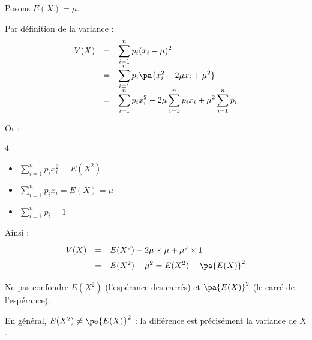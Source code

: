 \begin{demonstration}
	Posons $E(X) = \mu$.

	Par définition de la variance :
	\[
		\def\arraystretch{1.3}
		\begin{array}{rcl}
			V(X) & = & \displaystyle\sum_{i=1}^{n} p_i (x_i - \mu)^2                                                  \\
			     & = & \displaystyle\sum_{i=1}^{n} p_i \pa{x_i^2 - 2\mu x_i + \mu^2}                                  \\
			     & = & \displaystyle\sum_{i=1}^{n} p_i x_i^2 - 2\mu \sum_{i=1}^{n} p_i x_i + \mu^2 \sum_{i=1}^{n} p_i
		\end{array}
	\]

	Or :
	\begin{multicols}{4}
		\begin{itemize}
			\item $\displaystyle\sum_{i=1}^{n} p_i x_i^2 = E(X^2)$
			\item $\displaystyle\sum_{i=1}^{n} p_i x_i = E(X) = \mu$
			\item $\displaystyle\sum_{i=1}^{n} p_i = 1$
		\end{itemize}
	\end{multicols}

	Ainsi :
	\[
		\begin{array}{rcl}
			V(X) & = & E(X^2) - 2\mu \times \mu + \mu^2 \times 1 \\[1mm]
			     & = & E(X^2) - \mu^2 = E(X^2) - \pa{E(X)}^2
		\end{array}
	\]

\end{demonstration}

\begin{erreur}
	Ne pas confondre $E(X^2)$ (l'espérance des carrés) et $\pa{E(X)}^2$ (le carré de l'espérance).

	En général, $E(X^2) \neq \pa{E(X)}^2$ : la différence est précisément la variance de $X$.
\end{erreur}

